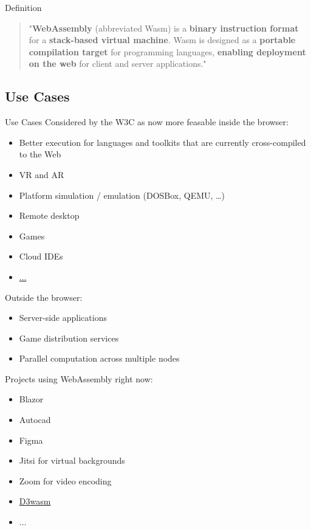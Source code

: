 \documentclass{beamer}
\begin{document}
\begin{frame}{Definition}
    \begin{quotation}
        "\textbf{WebAssembly} (abbreviated Wasm) is a \textbf{binary instruction format} for a \textbf{stack-based virtual machine}. Wasm is designed as a \textbf{portable compilation target} for programming languages, \textbf{enabling deployment on the web} for client and server applications."
    \end{quotation}
\end{frame}

\subsection{Use Cases}

\begin{frame}{Use Cases}
    Considered by the W3C as now more feasable inside the browser:
    \begin{itemize}
        \item Better execution for languages and toolkits that are currently cross-compiled to the Web
        \item VR and AR
        \item Platform simulation / emulation (DOSBox, QEMU, …)
        \item Remote desktop
        \item Games
        \item Cloud IDEs
        \item \href{https://webassembly.org/docs/use-cases/}{...}
    \end{itemize}
    Outside the browser:
    \begin{itemize}
        \item Server-side applications
        \item Game distribution services
        \item Parallel computation across multiple nodes
    \end{itemize}
\end{frame}

\begin{frame}
    Projects using WebAssembly right now:
    \begin{itemize}
        \item Blazor
        \item Autocad
        \item Figma
        \item Jitsi for virtual backgrounds
        \item Zoom for video encoding
        \item \href{https://wasm.continuation-labs.com/d3demo/}{D3wasm}
        \item ...
    \end{itemize}
\end{frame}
\end{document}
